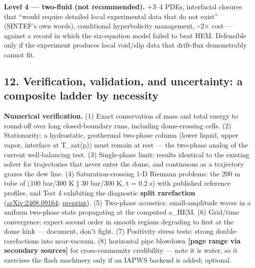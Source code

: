 \textbf{Level 4 --- two-fluid (not recommended).} +3--4 PDEs,
interfacial closures that ``would require detailed local experimental
data that do not exist'' (SINTEF's own words), conditional hyperbolicity
management, \textasciitilde2× cost --- against a record in which the
six-equation model failed to beat HEM. Defensible only if the experiment
produces local void/slip data that drift-flux demonstrably cannot fit.

\hypertarget{verification-validation-and-uncertainty-a-composite-ladder-by-necessity}{%
\subsection{12. Verification, validation, and uncertainty: a composite
ladder by
necessity}\label{verification-validation-and-uncertainty-a-composite-ladder-by-necessity}}

\textbf{Numerical verification.} (1) Exact conservation of mass and
total energy to round-off over long closed-boundary runs, including
dome-crossing cells. (2) Stationarity: a hydrostatic, geothermal
two-phase column (lower liquid, upper vapor, interface at T\_sat(p))
must remain at rest --- the two-phase analog of the current
well-balancing test. (3) Single-phase limit: results identical to the
existing solver for trajectories that never enter the dome, and
continuous as a trajectory grazes the dew line. (4) Saturation-crossing
1-D Riemann problems: the 200 m tube of \citet{kumar2024} (100 bar/300 K ‖ 30
bar/300 K, t = 0.2 s) with published reference profiles, and \citet{log2021} Test 4 exhibiting the diagnostic \textbf{split rarefaction}
(\href{https://arxiv.org/html/2408.09164v2}{arXiv:2408.09164};
\href{https://www.pvv.ntnu.no/~stm/dring/hllcs-hem.pdf}{preprint}). (5) Two-phase acoustics: small-amplitude waves in a
uniform two-phase state propagating at the computed a\_HEM. (6)
Grid/time convergence: expect second order in smooth regions degrading
to first at the dome kink --- document, don't fight. (7) Positivity
stress tests: strong double-rarefactions into near-vacuum. (8)
\citet{edwards1970} horizontal pipe blowdown \textbf{{[}page range via secondary sources{]}} for
cross-community credibility --- note it is water, so it exercises the
flash machinery only if an IAPWS backend is added; optional.

